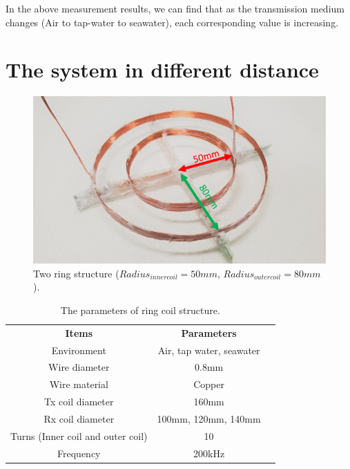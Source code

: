 In the above measurement results, we can find that as the transmission medium changes (Air to tap-water to seawater), each corresponding value is increasing.

\section{The system in different distance}

\begin{figure}[htbp]
    \centering
    \includegraphics[width=0.7\linewidth]{images/3_two_ring_coil_5cm_8cm.png}
    \caption{Two ring structure ($Radius_{inner coil}=50mm$, $Radius_{outer coil}=80mm$).}
    \label{fig:3_two_ring_coil_5cm_8cm}
\end{figure}

\begin{table}[htbp]
    \centering
    \caption{The parameters of ring coil structure.}
    \begin{tabular}{ c|cc }
        \thickhline
        \textbf{Items}                    & \textbf{Parameters}      \\
        \thickhline
        Environment                       & Air, tap water, seawater \\ \hline
        Wire diameter                     & 0.8mm                    \\ \hline
        Wire material                     & Copper                   \\
        \hline
        Tx coil diameter                  & 160mm                    \\ \hline
        Rx coil diameter                  & 100mm, 120mm, 140mm      \\ \hline
        Turns (Inner coil and outer coil) & 10                       \\ \hline
        Frequency                         & 200kHz                   \\ \hline
    \end{tabular}
    \label{table:ring coil parameters - different distance}
\end{table}

